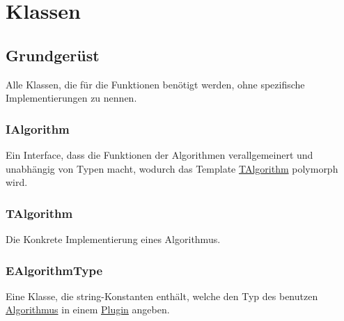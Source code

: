 \section{Klassen}

\subsection{Grundgerüst}
Alle Klassen, die für die Funktionen benötigt werden, ohne spezifische Implementierungen zu nennen.
\subsubsection{IAlgorithm}\label{Workflow:IAlgorithm}
Ein Interface, dass die Funktionen der Algorithmen verallgemeinert und unabhängig von Typen macht, wodurch das Template \hyperref[Workflow:TAlgorithm]{TAlgorithm} polymorph wird.
\beginMembers
{}
\closeMembers

\subsubsection{TAlgorithm}\label{Workflow:TAlgorithm}
Die Konkrete Implementierung eines Algorithmus.
\beginMembers
{}
\closeMembers

\subsubsection{EAlgorithmType}
Eine Klasse, die string-Konstanten enthält, welche den Typ des benutzen \hyperref[Workflow:IAlgorithm]{Algorithmus} in einem \hyperref[Workflow:APlugin]{Plugin} angeben.
\beginAttributes
{}
\closeMembers

